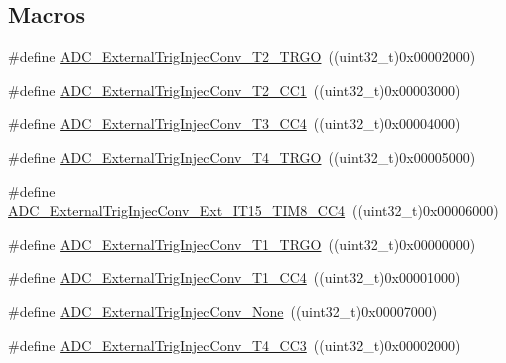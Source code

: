 \subsection*{Macros}
\begin{DoxyCompactItemize}
\item 
\#define \hyperlink{group___a_d_c__external__trigger__sources__for__injected__channels__conversion_gaaad112b2b035dfd77c9743197c51b16f}{A\+D\+C\+\_\+\+External\+Trig\+Injec\+Conv\+\_\+\+T2\+\_\+\+T\+R\+GO}~((uint32\+\_\+t)0x00002000)
\item 
\#define \hyperlink{group___a_d_c__external__trigger__sources__for__injected__channels__conversion_ga49089501c5bf2a2c22019fbca4b688e9}{A\+D\+C\+\_\+\+External\+Trig\+Injec\+Conv\+\_\+\+T2\+\_\+\+C\+C1}~((uint32\+\_\+t)0x00003000)
\item 
\#define \hyperlink{group___a_d_c__external__trigger__sources__for__injected__channels__conversion_ga6c9ddf9bba0cefe77dbcd601aed24f7b}{A\+D\+C\+\_\+\+External\+Trig\+Injec\+Conv\+\_\+\+T3\+\_\+\+C\+C4}~((uint32\+\_\+t)0x00004000)
\item 
\#define \hyperlink{group___a_d_c__external__trigger__sources__for__injected__channels__conversion_gab12e5503085cdb9dde4a59614e421284}{A\+D\+C\+\_\+\+External\+Trig\+Injec\+Conv\+\_\+\+T4\+\_\+\+T\+R\+GO}~((uint32\+\_\+t)0x00005000)
\item 
\#define \hyperlink{group___a_d_c__external__trigger__sources__for__injected__channels__conversion_gaa23965b742e08142e5d1c453166dbcc2}{A\+D\+C\+\_\+\+External\+Trig\+Injec\+Conv\+\_\+\+Ext\+\_\+\+I\+T15\+\_\+\+T\+I\+M8\+\_\+\+C\+C4}~((uint32\+\_\+t)0x00006000)
\item 
\#define \hyperlink{group___a_d_c__external__trigger__sources__for__injected__channels__conversion_gabf47f66e60c166f6b63b805f72ad94b0}{A\+D\+C\+\_\+\+External\+Trig\+Injec\+Conv\+\_\+\+T1\+\_\+\+T\+R\+GO}~((uint32\+\_\+t)0x00000000)
\item 
\#define \hyperlink{group___a_d_c__external__trigger__sources__for__injected__channels__conversion_gabd27bcc6ff5af6713a124b3801759bcf}{A\+D\+C\+\_\+\+External\+Trig\+Injec\+Conv\+\_\+\+T1\+\_\+\+C\+C4}~((uint32\+\_\+t)0x00001000)
\item 
\#define \hyperlink{group___a_d_c__external__trigger__sources__for__injected__channels__conversion_gaad11a68fca76d97b97dc2554dac5cb16}{A\+D\+C\+\_\+\+External\+Trig\+Injec\+Conv\+\_\+\+None}~((uint32\+\_\+t)0x00007000)
\item 
\#define \hyperlink{group___a_d_c__external__trigger__sources__for__injected__channels__conversion_gae342ca48595f0b2bf866943969026581}{A\+D\+C\+\_\+\+External\+Trig\+Injec\+Conv\+\_\+\+T4\+\_\+\+C\+C3}~((uint32\+\_\+t)0x00002000)

\end{DoxyCompactItemize}
